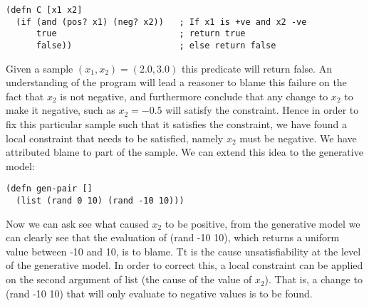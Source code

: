 \begin{verbatim}
(defn C [x1 x2]
  (if (and (pos? x1) (neg? x2))   ; If x1 is +ve and x2 -ve
      true                        ; return true
      false))                     ; else return false
\end{verbatim}

Given a sample $(x_1, x_2) = (2.0, 3.0)$ this predicate will return false.
An understanding of the program will lead a reasoner to blame this failure on the fact that $x_2$ is not negative, and furthermore conclude that any change to $x_2$ to make it negative, such as $x_2 = -0.5$ will satisfy the constraint.
Hence in order to fix this particular sample such that it satisfies the constraint, we have found a local constraint that needs to be satisfied, namely $x_2$ must be negative.
We have attributed blame to part of the sample.
We can extend this idea to the generative model:

\begin{verbatim}
(defn gen-pair []
  (list (rand 0 10) (rand -10 10)))
\end{verbatim}

Now we can ask see what caused $x_2$ to be positive, from the generative model we can clearly see that the evaluation of (rand -10 10), which returns a uniform value between -10 and 10, is to blame.
Tt is the cause unsatisfiability at the level of the generative model.
In order to correct this, a local constraint can be applied on the second argument of list (the cause of the value of $x_2$).  That is, a change to (rand -10 10) that will only evaluate to negative values is to be found.

